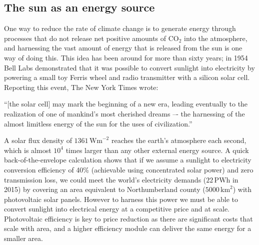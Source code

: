 


\subsection{The sun as an energy source}
One way to reduce the rate of climate change is to generate energy through processes that do not release net positive amounts of CO$_2$ into the atmosphere, and harnessing the vast amount of energy that is released from the sun is one way of doing this. This idea has been around for more than sixty years; in 1954 Bell Labs demonstrated that it was possible to convert sunlight into electricity by powering a small toy Ferris wheel and radio transmitter with a silicon solar cell. Reporting this event, The New York Times wrote:
\begin{displayquote}
“[the solar cell] may mark the beginning of a new era, leading eventually to the realization of one of mankind’s most cherished dreams –- the harnessing of the almost limitless energy of the sun for the uses of civilization.”
\end{displayquote}
A solar flux density of $1361\,\textrm{Wm}^{-2}$ reaches the earth's atmosphere each second, which is almost $10^4$ times larger than any other external energy source.\autocite{Kopp2011} A quick back-of-the-envelope calculation shows that if we assume a sunlight to electricity conversion efficiency of 40\% (achievable using concentrated solar power) and zero transmission loss, we could meet the world's electricity demands ($22\,\textrm{PWh}$ in 2015\autocite{IEA2017}) by covering an area equivalent to Northumberland county ($5000\,\textrm{km}^2$) with photovoltaic solar panels.
%
However to harness this power we must be able to convert sunlight into electrical energy at a competitive price and at scale. Photovoltaic efficiency is key to price reduction as there are significant costs that scale with area,\autocite{Fraunhofer2015,Green2016} and a higher efficiency module can deliver the same energy for a smaller area.

